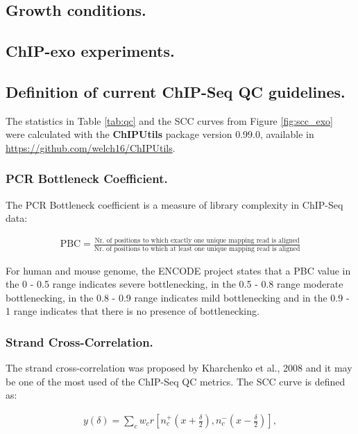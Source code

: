 \documentclass{bmcart}\usepackage[]{graphicx}\usepackage[]{color}
\begin{document}
\subsection*{Growth conditions.}


\subsection*{ChIP-exo experiments.}


\subsection*{Definition of current ChIP-Seq QC guidelines.}

The statistics in Table \ref{tab:qc} and the SCC curves from Figure
\ref{fig:scc_exo} were calculated with the \textbf{ChIPUtils} package
version 0.99.0, available in
\url{https://github.com/welch16/ChIPUtils}. 

\subsubsection*{PCR Bottleneck Coefficient.}

The PCR Bottleneck coefficient is a measure of library complexity in
ChIP-Seq data:

\begin{align}
  \mbox{PBC} = \frac{\text{Nr. of positions to which exactly one
      unique mapping read is aligned}}{\text{Nr. of positions to
      which at least one unique mapping read is aligned}} \nonumber
\end{align}

For human and mouse genome, the ENCODE project states that a PBC value
in the 0 - 0.5 range indicates severe bottlenecking, in the 0.5 - 0.8
range moderate bottlenecking, in the 0.8 - 0.9 range indicates mild
bottlenecking and in the 0.9 - 1 range indicates that there is no
presence of bottlenecking.

\subsubsection*{Strand Cross-Correlation.}

The strand cross-correlation was proposed by Kharchenko et al., 2008
\cite{strandcc} and it may be one of the most used of the ChIP-Seq QC
metrics. The SCC curve is defined as:

\begin{align}
  y(\delta) = \sum_c w_c r\left[ n_c^+ \left(x + \frac{\delta}{2}
    \right), n_c^- \left( x- \frac{\delta}{2} \right)\right],
\label{scc}
\end{align}
\end{document}
